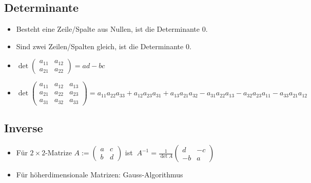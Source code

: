 \documentclass[a4paper,10pt]{article}
\begin{document}
\subsection{Determinante}
\begin{itemize}
    \item Besteht eine Zeile/Spalte aus Nullen, ist die Determinante \( 0 \).
    \item Sind zwei Zeilen/Spalten gleich, ist die Determinante \( 0 \).
    \item \( \det \begin{pmatrix}
        a_{11} & a_{12} \\
        a_{21} & a_{22}
    \end{pmatrix} = ad - bc \)
    \item \( \det \begin{pmatrix}
        a_{11} & a_{12} & a_{13} \\
        a_{21} & a_{22} & a_{23} \\
        a_{31} & a_{32} & a_{33}
    \end{pmatrix} = a_{11}a_{22}a_{33} + a_{12}a_{23}a_{31} + a_{13}a_{21}a_{32} - a_{31}a_{22}a_{13} - a_{32}a_{23}a_{11} - a_{33}a_{21}a_{12} \)
\end{itemize}

\subsection{Inverse} \label{inverse}
\begin{itemize}
    \item Für \(2 \times 2 \)-Matrize \( A := \begin{pmatrix}
        a & c \\
        b & d
    \end{pmatrix} \) ist \( \ A^{-1} = \frac{1}{\det A} \begin{pmatrix}
        d & -c \\
        -b & a
    \end{pmatrix} \)
    \item Für höherdimensionale Matrizen: Gauss-Algorithmus
\end{itemize}
\end{document}
